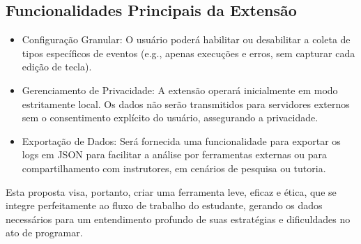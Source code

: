 \subsection{Funcionalidades Principais da Extensão}
\label{subsec:funcionalidades-principais}
\begin{itemize}
\item Configuração Granular: O usuário poderá habilitar ou desabilitar a coleta de tipos específicos de eventos (e.g., apenas execuções e erros, sem capturar cada edição de tecla).

\item Gerenciamento de Privacidade: A extensão operará inicialmente em modo estritamente local. Os dados não serão transmitidos para servidores externos sem o consentimento explícito do usuário, assegurando a privacidade.

\item Exportação de Dados: Será fornecida uma funcionalidade para exportar os logs em JSON para facilitar a análise por ferramentas externas ou para compartilhamento com instrutores, em cenários de pesquisa ou tutoria.

\end{itemize}

Esta proposta visa, portanto, criar uma ferramenta leve, eficaz e ética, que se integre perfeitamente ao fluxo de trabalho do estudante, gerando os dados necessários para um entendimento profundo de suas estratégias e dificuldades no ato de programar.
